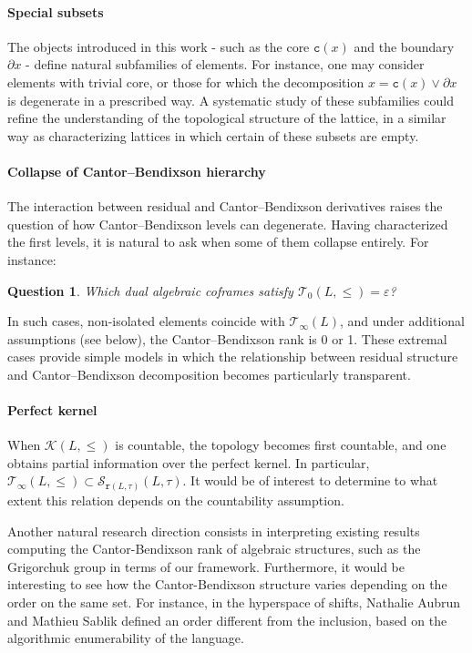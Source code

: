 \documentclass{article}
\newtheorem{question}[theorem]{Question}
\begin{document}
\paragraph{Special subsets}
The objects introduced in this work - such as the core $\texttt{c}(x)$ and the boundary $\partial x$ - define natural subfamilies of elements. For instance, one may consider elements with trivial core, or those for which the decomposition $x = \texttt{c}(x) \vee \partial x$ is degenerate in a prescribed way.
A systematic study of these subfamilies could refine the understanding of the topological structure of the lattice, in a similar way as characterizing lattices in which certain of these subsets are empty.

\paragraph{Collapse of Cantor–Bendixson hierarchy}

The interaction between residual and Cantor–Bendixson derivatives raises the question of how Cantor–Bendixson levels can degenerate. Having characterized the first levels, it is natural to ask when some of them collapse entirely. For instance:
\begin{question}
Which dual algebraic coframes satisfy $\mathcal{T}_0(L,\le)={\varepsilon}$?
\end{question}
In such cases, non-isolated elements coincide with $\mathcal{T}_{\infty}(L)$, and under additional assumptions (see below), the Cantor–Bendixson rank is 0 or 1. These extremal cases provide simple models in which the relationship between residual structure and Cantor–Bendixson decomposition becomes particularly transparent.
\paragraph{Perfect kernel}
When $\mathcal{K}(L,\le)$ is countable, the topology becomes first countable, and one obtains partial information over the perfect kernel. In particular, $\mathcal{T}_{\infty}(L,\le) \subset \mathcal{S}_{\texttt{r}(L,\tau)}(L,\tau)$. It would be of interest to determine to what extent this relation depends on the countability assumption.
\medskip

Another natural research direction consists in interpreting existing results computing the Cantor-Bendixson rank of algebraic structures, such as the Grigorchuk group \cite{skipper2020cantorbendixsonrankgrigorchukgroup} in terms of our framework. Furthermore, it would be interesting to see how the Cantor-Bendixson structure varies depending on the order on the same set. For instance, in the hyperspace of shifts, Nathalie Aubrun and Mathieu Sablik \cite{AubrunSablik2009} defined an order different from the inclusion, based on the algorithmic enumerability of the language. 
\end{document}
